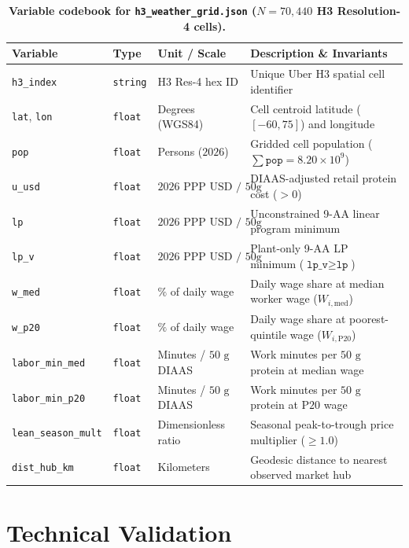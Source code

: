 \documentclass[11pt,a4paper]{article}
\begin{document}
\begin{table}[htbp]
\centering
\caption{\textbf{Variable codebook for \texttt{h3\_weather\_grid.json} ($N = 70{,}440$ H3 Resolution-4 cells).}}
\label{tab:codebook}
\small
\begin{tabular}{llll}
\toprule
\textbf{Variable} & \textbf{Type} & \textbf{Unit / Scale} & \textbf{Description \& Invariants} \\
\midrule
\texttt{h3\_index} & \texttt{string} & H3 Res-4 hex ID & Unique Uber H3 spatial cell identifier \\
\texttt{lat}, \texttt{lon} & \texttt{float} & Degrees (WGS84) & Cell centroid latitude ($[-60, 75]$) and longitude \\
\texttt{pop} & \texttt{float} & Persons ($2026$) & Gridded cell population ($\sum \texttt{pop} = 8.20 \times 10^9$) \\
\texttt{u\_usd} & \texttt{float} & $2026\text{ PPP USD / 50g}$ & DIAAS-adjusted retail protein cost ($> 0$) \\
\texttt{lp} & \texttt{float} & $2026\text{ PPP USD / 50g}$ & Unconstrained 9-AA linear program minimum \\
\texttt{lp\_v} & \texttt{float} & $2026\text{ PPP USD / 50g}$ & Plant-only 9-AA LP minimum ($\texttt{lp\_v} \ge \texttt{lp}$) \\
\texttt{w\_med} & \texttt{float} & $\%$ of daily wage & Daily wage share at median worker wage ($W_{i,\text{med}}$) \\
\texttt{w\_p20} & \texttt{float} & $\%$ of daily wage & Daily wage share at poorest-quintile wage ($W_{i,\text{P20}}$) \\
\texttt{labor\_min\_med} & \texttt{float} & Minutes / $50\text{ g}$ DIAAS & Work minutes per $50\text{ g}$ protein at median wage \\
\texttt{labor\_min\_p20} & \texttt{float} & Minutes / $50\text{ g}$ DIAAS & Work minutes per $50\text{ g}$ protein at $\text{P20}$ wage \\
\texttt{lean\_season\_mult} & \texttt{float} & Dimensionless ratio & Seasonal peak-to-trough price multiplier ($\ge 1.0$) \\
\texttt{dist\_hub\_km} & \texttt{float} & Kilometers & Geodesic distance to nearest observed market hub \\
\bottomrule
\end{tabular}
\end{table}

\section{Technical Validation}
\end{document}
